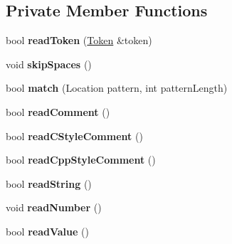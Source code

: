 \subsection*{Private Member Functions}
\begin{DoxyCompactItemize}
\item 
\hypertarget{class_json_1_1_reader_a7cb0631963cc0fd4ff6ed0f570976864}{}bool {\bfseries read\+Token} (\hyperlink{class_json_1_1_reader_1_1_token}{Token} \&token)\label{class_json_1_1_reader_a7cb0631963cc0fd4ff6ed0f570976864}

\item 
\hypertarget{class_json_1_1_reader_a40d0f69d15aeb2d52ff78d794f5ab8b2}{}void {\bfseries skip\+Spaces} ()\label{class_json_1_1_reader_a40d0f69d15aeb2d52ff78d794f5ab8b2}

\item 
\hypertarget{class_json_1_1_reader_a3e5a7bc6b7b53f2ca8cb9da42f8ffb21}{}bool {\bfseries match} (Location pattern, int pattern\+Length)\label{class_json_1_1_reader_a3e5a7bc6b7b53f2ca8cb9da42f8ffb21}

\item 
\hypertarget{class_json_1_1_reader_ad2690e860a1b3332c5401fb0850ba065}{}bool {\bfseries read\+Comment} ()\label{class_json_1_1_reader_ad2690e860a1b3332c5401fb0850ba065}

\item 
\hypertarget{class_json_1_1_reader_ae0ffe796abdc3c5851589ee500e28c79}{}bool {\bfseries read\+C\+Style\+Comment} ()\label{class_json_1_1_reader_ae0ffe796abdc3c5851589ee500e28c79}

\item 
\hypertarget{class_json_1_1_reader_a6716ef6290b0f469efaf8d379c357967}{}bool {\bfseries read\+Cpp\+Style\+Comment} ()\label{class_json_1_1_reader_a6716ef6290b0f469efaf8d379c357967}

\item 
\hypertarget{class_json_1_1_reader_a6328a0b1994e05118886f9fc9c608643}{}bool {\bfseries read\+String} ()\label{class_json_1_1_reader_a6328a0b1994e05118886f9fc9c608643}

\item 
\hypertarget{class_json_1_1_reader_afb31bfda6bb27d6453057a47655e8363}{}void {\bfseries read\+Number} ()\label{class_json_1_1_reader_afb31bfda6bb27d6453057a47655e8363}

\item 
\hypertarget{class_json_1_1_reader_a47e56844b803d41ec993a83fadf4495c}{}bool {\bfseries read\+Value} ()\label{class_json_1_1_reader_a47e56844b803d41ec993a83fadf4495c}


\end{DoxyCompactItemize}
